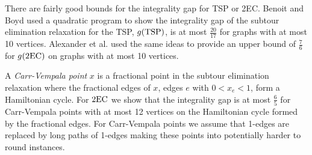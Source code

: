 There are fairly good bounds for the integrality gap for TSP or 2EC. Benoit and Boyd \cite{TSPcompute} used a quadratic program to show the integrality gap of the subtour elimination relaxation for the TSP, $g(\operatorname{{{TSP}}})$, is at most $\frac{20}{17}$ for graphs with at most 10 vertices. Alexander et al. \cite{alexander2006integrality} used the same ideas to provide an upper bound of $\frac{7}{6}$ for $g(\2ec)$ on graphs with at most 10 vertices. 

A \textit{Carr-Vempala point} $x$ is a fractional point in the subtour elimination relaxation where the fractional edges of $x$, edges $e$ with $0<x_e<1$, form a Hamiltonian cycle. For $\2ec$ we show that the integrality gap is at most $\frac{6}{5}$ for Carr-Vempala points with at most 12 vertices on the Hamiltonian cycle formed by the fractional edges. For Carr-Vempala points we assume that 1-edges are replaced by long paths of 1-edges making these points into potentially harder to round instances.




